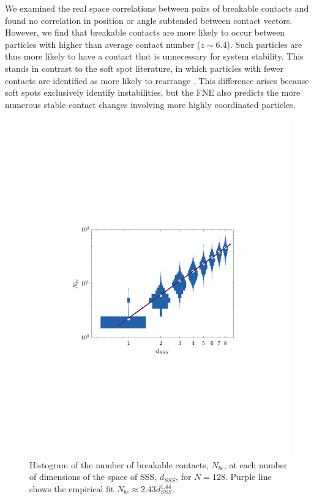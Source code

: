 We examined the real space correlations between pairs of breakable contacts and found no correlation in position or angle subtended between contact vectors. However, we find that breakable contacts are more likely to occur between particles with higher than average contact number ($z\sim6.4$). Such particles are thus more likely to have a contact that is unnecessary for system stability. This stands in contrast to the soft spot literature, in which particles with fewer contacts are identified as more likely to rearrange \cite{manning_vibrational_2011,ridout_correlation_2020,rocks_learning-based_2021,richard_predicting_2020}. This difference arises because soft spots exclusively identify instabilities, but the FNE also predicts the more numerous stable contact changes involving more highly coordinated particles.

\begin{figure}[t!]
\includegraphics[width=\columnwidth, trim=103 239 130 252, clip]{contactBreakingPaper/numBreakable.pdf}
\caption{Histogram of the number of breakable contacts, $N_{bc}$, at each number of dimensions of the space of SSS, $d_{SSS}$, for $N=128$. %
Purple line shows the empirical fit  $N_{bc} \approx 2.43d_{SSS}^{1.44}$.}
\label{plot:numBreakable}
\end{figure}

